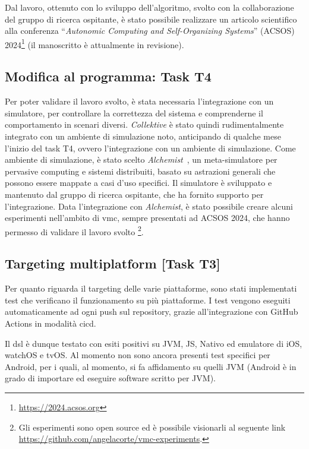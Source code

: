 \documentclass[13pt, a4paper]{article}
\newcommand{\ck}{\emph{Collektive}}
\begin{document}
Dal lavoro,
ottenuto con lo sviluppo dell'algoritmo,
svolto con la collaborazione del gruppo di ricerca ospitante,
è stato possibile realizzare un articolo scientifico alla conferenza
``\emph{Autonomic Computing and Self-Organizing Systems}'' (ACSOS) 2024\footnote{\url{https://2024.acsos.org}}
(il manoscritto è attualmente in revisione).

\subsection{Modifica al programma: Task T4}

Per poter validare il lavoro svolto, è stata necessaria l'integrazione con un simulatore,
    per controllare la correttezza del sistema e comprenderne il comportamento in scenari diversi.
%
\ck{} è stato quindi rudimentalmente integrato con un ambiente di simulazione noto,
anticipando di qualche mese l'inizio del task T4, ovvero l'integrazione con un ambiente di simulazione.
%
Come ambiente di simulazione, è stato scelto \emph{Alchemist}~\cite{PianiniJOS2013},
un meta-simulatore per pervasive computing e sistemi distribuiti,
basato su astrazioni generali che possono essere mappate a casi d'uso specifici.
%
Il simulatore è sviluppato e mantenuto dal gruppo di ricerca ospitante,
che ha fornito supporto per l'integrazione.
%
Data l'integrazione con \emph{Alchemist}, è stato possibile creare alcuni esperimenti nell'ambito di \ac{vmc},
    sempre presentati ad ACSOS 2024, che hanno permesso di validare il lavoro svolto \footnote{
    Gli esperimenti sono open source ed è possibile visionarli al seguente link \url{https://github.com/angelacorte/vmc-experiments}.
}.

\subsection{Targeting multiplatform [Task T3]}\label{subsec:task-t3-[targeting-multiplatform]}
Per quanto riguarda il targeting delle varie piattaforme,
    sono stati implementati test che verificano il funzionamento su più piattaforme.
%
I test vengono eseguiti automaticamente ad ogni push sul repository, grazie all'integrazione con GitHub Actions in modalità \ac{cicd}.

Il \ac{dsl} è dunque testato con esiti positivi su JVM, JS, Nativo ed emulatore di iOS, watchOS e tvOS.
%
Al momento non sono ancora presenti test specifici per Android,
per i quali, al momento,
si fa affidamento su quelli \ac{JVM}
(Android è in grado di importare ed eseguire software scritto per \ac{JVM}).
\end{document}
